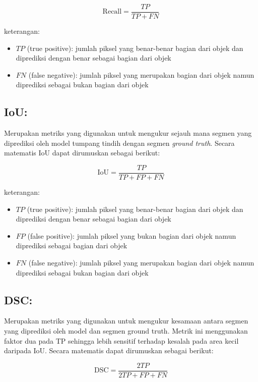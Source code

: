 \begin{equation}
	\text{Recall} = \frac{TP}{TP + FN}
\end{equation}

\noindent
keterangan:
\begin{itemize}
	\item $TP$ (true positive): jumlah piksel yang benar-benar bagian dari objek dan diprediksi dengan benar sebagai bagian dari objek
	\item $FN$ (false negative): jumlah piksel yang merupakan bagian dari objek namun diprediksi sebagai bukan bagian dari objek
\end{itemize}

\subsection{IoU:}
\noindent Merupakan metriks yang digunakan untuk mengukur sejauh mana segmen yang diprediksi oleh model tumpang tindih dengan segmen \textit{ground truth}\cite{jiang_iu-net_2023}. Secara matematis IoU dapat dirumuskan sebagai berikut:

\begin{equation}
	\text{IoU} = \frac{TP}{TP + FP + FN}
\end{equation}

\noindent
keterangan:
\begin{itemize}
	\item $TP$ (true positive): jumlah piksel yang benar-benar bagian dari objek dan diprediksi dengan benar sebagai bagian dari objek
	\item $FP$ (false positive): jumlah piksel yang bukan bagian dari objek namun diprediksi sebagai bagian dari objek
	\item $FN$ (false negative): jumlah piksel yang merupakan bagian dari objek namun diprediksi sebagai bukan bagian dari objek
\end{itemize}

\subsection{DSC:}

\noindent Merupakan metriks yang digunakan untuk mengukur kesamaan antara segmen yang diprediksi oleh model dan segmen ground truth\cite{jiang_iu-net_2023}. Metrik ini menggunakan faktor dua pada TP sehingga lebih sensitif terhadap kesalah pada area kecil daripada IoU. Secara matematis dapat dirumuskan sebagai berikut:

\begin{equation}
	\text{DSC} =  \frac{2TP}{2TP + FP + FN}
\end{equation}

